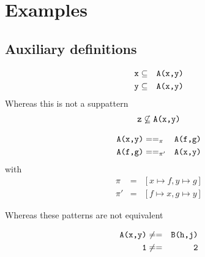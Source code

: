 \section{Examples}



\newcommand{\patexp}[2]{#1 \texttt{.} #2}
\newcommand{\fargs}[2]{#1 \texttt{ | } #2}
\newcommand{\cargs}[2]{#1 \texttt{,} #2}
\newcommand{\con}[2]{#1 \texttt{(} #2 \texttt{)}}
\newcommand{\fcall}[2]{#1 \texttt{(} #2 \texttt{)}}
\newcommand{\pipe}{\phantom{\ttt{fu}}\ttt{|}}








\subsection{Auxiliary definitions}

\begin{example}
  \label{ex:suppattern1}
  \begin{eqnarray*}
    \texttt{x} &\subseteq& \texttt{A(x,y)} \\
    \texttt{y} &\subseteq& \texttt{A(x,y)}
\end{eqnarray*}
Whereas this is not a suppattern
\begin{eqnarray*}
  \texttt{z} \not \subseteq \texttt{A(x,y)}
\end{eqnarray*}
\end{example}

\begin{example}[Pattern equivalence, $==_{\pi}$]
  \label{ex:pattern-equiv1}
  \begin{eqnarray*}
    \texttt{A(x,y)} &==_{\pi}& \texttt{A(f,g)}\\
    \texttt{A(f,g)} &==_{\pi'}& \texttt{A(x,y)}
  \end{eqnarray*}
with
  \begin{eqnarray*}
    \pi &=& [x\mapsto f, y \mapsto g] \\
    \pi' &=& [f \mapsto x, g \mapsto y]
\end{eqnarray*}

Whereas these patterns are not equivalent

  \begin{eqnarray*}
    \texttt{A(x,y)} &\not ==& \texttt{B(h,j)} \\
    \texttt{1} &\not ==& \texttt{2}
  \end{eqnarray*}
\end{example}

